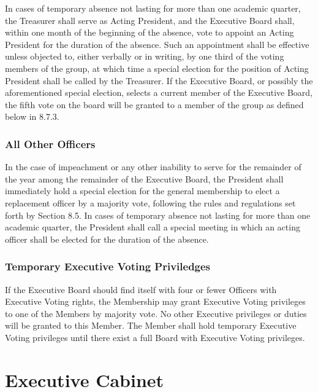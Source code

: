 \documentclass{article}
\begin{document}
In cases of temporary absence not lasting for more than one academic
quarter, the Treasurer shall serve as Acting President, and the Executive
Board shall, within one month of the beginning of the absence, vote
to appoint an Acting President for the duration of the absence. Such
an appointment shall be effective unless objected to, either verbally
or in writing, by one third of the voting members of the group, at
which time a special election for the position of Acting President
shall be called by the Treasurer. If the Executive Board, or possibly
the aforementioned special election, selects a current member of the
Executive Board, the fifth vote on the board will be granted to a
member of the group as defined below in 8.7.3.

\subsubsection{All Other Officers}

In the case of impeachment or any other inability to serve for the remainder of the year among the remainder
of the Executive Board, the President shall immediately hold a special election for the general membership
to elect a replacement officer by a majority vote, following the rules and regulations set forth by Section
8.5. In cases of temporary absence not lasting for more than one academic quarter, the President shall call
a special meeting in which an acting officer shall be elected for the duration of the absence.

\subsubsection{Temporary Executive Voting Priviledges}

If the Executive Board should find itself with four or fewer Officers
with Executive Voting rights, the Membership may grant Executive Voting
privileges to one of the Members by majority vote. No other Executive
privileges or duties will be granted to this Member. The Member shall
hold temporary Executive Voting privileges until there exist a full
Board with Executive Voting privileges.

\section{Executive Cabinet}
\end{document}
